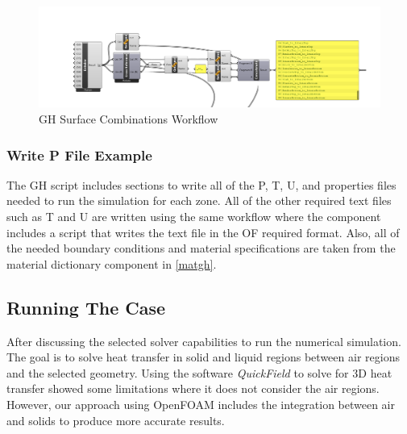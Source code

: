 \begin{figure}[tbh]
\centering
\includegraphics[width=0.77\columnwidth]{Figures/file (8).png}
\hspace{0.7cm}
\caption{GH Surface Combinations Workflow}
\label{surfgh}
\end{figure}



\subsubsection{Write P File Example}
The GH script includes sections to write all of the P, T, U, and properties files needed to run the simulation for each zone. All of the other required text files such as T and U are written using the same workflow where the component includes a script that writes the text file in the OF required format. Also, all of the needed boundary conditions and material specifications are taken from the material dictionary component in \cref{matgh}.



















\subsection{Running The Case}    
 
After discussing the selected solver capabilities to run the numerical simulation. The goal is to solve heat transfer in solid and liquid regions between air regions and the selected geometry. Using the software \textit{QuickField}  to solve for 3D heat transfer showed some limitations where it does not consider the air regions. However, our approach using OpenFOAM includes the integration between air and solids to produce more accurate results. 


